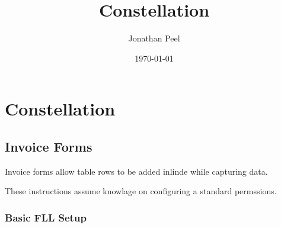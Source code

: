 \documentclass[11pt]{article}
\author{Jonathan Peel}
\date{\today}
\title{Constellation}
\begin{document}
\maketitle
\tableofcontents

\section{Constellation}
\label{sec:orgdcf79fd}

\subsection{Invoice Forms}
\label{sec:org3c4a0c5}

Invoice forms allow table rows to be added inlinde while capturing data.

These instructions assume knowlage on configuring a standard permssions.
\subsubsection{Basic FLL Setup}
\label{sec:org47d37ac}
\end{document}
